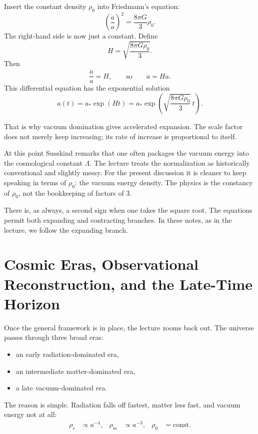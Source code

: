 Insert the constant density \(\rho_0\) into Friedmann's equation:
\begin{equation}
\left(\frac{\dot a}{a}\right)^2 = \frac{8\pi G}{3}\rho_0.
\end{equation}
The right-hand side is now just a constant. Define
\begin{equation}
H=\sqrt{\frac{8\pi G\rho_0}{3}}.
\end{equation}
Then
\begin{equation}
\frac{\dot a}{a}=H,
\qquad\text{so}\qquad
\dot a = Ha.
\end{equation}
This differential equation has the exponential solution
\begin{equation}
a(t)=a_{\ast}\exp(Ht)
=
a_{\ast}\exp\!\left(\sqrt{\frac{8\pi G\rho_0}{3}}\,t\right).
\end{equation}

That is why vacuum domination gives accelerated expansion. The scale factor does not merely keep increasing; its rate of increase is proportional to itself.

At this point Susskind remarks that one often packages the vacuum energy into the cosmological constant \(\Lambda\). The lecture treats the normalization as historically conventional and slightly messy. For the present discussion it is cleaner to keep speaking in terms of \(\rho_0\): the vacuum energy density. The physics is the constancy of \(\rho_0\), not the bookkeeping of factors of \(3\).

There is, as always, a second sign when one takes the square root. The equations permit both expanding and contracting branches. In these notes, as in the lecture, we follow the expanding branch.

\section{Cosmic Eras, Observational Reconstruction, and the Late-Time Horizon}

Once the general framework is in place, the lecture zooms back out. The universe passes through three broad eras:
\begin{itemize}
\item an early radiation-dominated era,
\item an intermediate matter-dominated era,
\item a late vacuum-dominated era.
\end{itemize}
The reason is simple. Radiation falls off fastest, matter less fast, and vacuum energy not at all:
\begin{align}
\rho_r &\propto a^{-4},
&
\rho_m &\propto a^{-3},
&
\rho_0 &= \text{const}.
\end{align}

